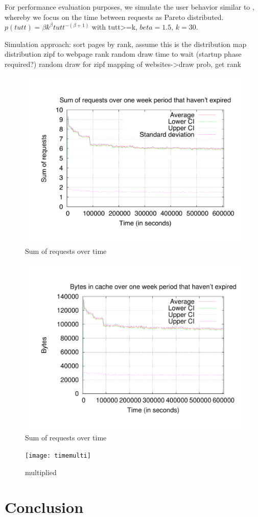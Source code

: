 \documentclass[letterpaper,conference]{IEEEtran}
\begin{document}

For performance evaluation purposes, we simulate the user behavior similar to \cite{AnCoGrPa03}, whereby we focus on the time between requests as Pareto distributed.
$p(tutt)=\beta k^\beta tutt^{-(\beta+1)}$ with tutt>=k, $beta=1.5$, $k=30$.


Simulation approach:
sort pages by rank, assume this is the distribution
map distribution zipf to webpage rank
random draw time to wait (startup phase required?)
random draw for zipf mapping of websites->draw prob, get rank
	
	
\begin{figure}
	\centering
	\includegraphics[width=.95\linewidth]{Sum_of_requests_over_time}
	\caption{Sum of requests over time  }
	\label{fig:comp_cpd}
\end{figure}

\begin{figure}
	\centering
	\includegraphics[width=.95\linewidth]{Sum_of_bytes_over_time}
	\caption{Sum of requests over time  }
	\label{fig:comp_cpd}
\end{figure}

\begin{figure}
	\centering
	\texttt{[image: timemulti]}
	\caption{multiplied}
	\label{fig:comp_cpd}
\end{figure}



\section{Conclusion}



\end{document}
